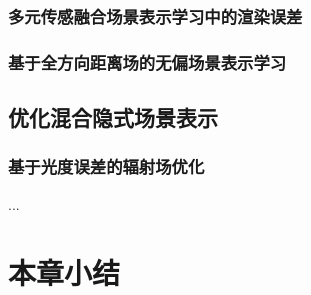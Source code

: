 \subsubsection{多元传感融合场景表示学习中的渲染误差}

\subsubsection{基于全方向距离场的无偏场景表示学习}

\subsection{优化混合隐式场景表示}

\subsubsection{基于光度误差的辐射场优化}

...

\section{本章小结}